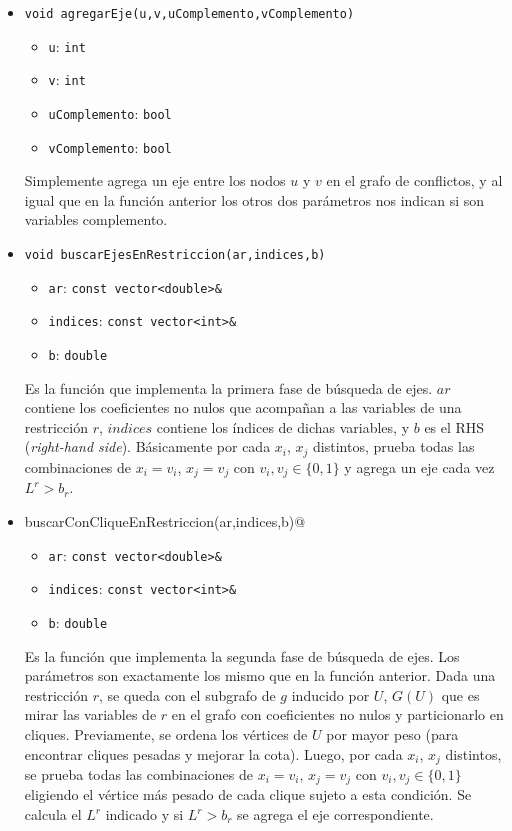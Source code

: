 \begin{itemize}
\item \verb_void agregarEje(u,v,uComplemento,vComplemento)_
	\begin{itemize}
	\item \verb_u_: \verb_int_
	\item \verb_v_: \verb_int_
	\item \verb_uComplemento_: \verb_bool_
	\item \verb_vComplemento_: \verb_bool_
	\end{itemize}
Simplemente agrega un eje entre los nodos $u$ y $v$ en el grafo de conflictos, y al igual que en la funci\'on anterior los otros dos par\'ametros nos indican si son variables complemento.

\item \verb_void buscarEjesEnRestriccion(ar,indices,b)_
	\begin{itemize}
	\item \verb_ar_: \verb_const vector<double>&_
	\item \verb_indices_: \verb_const vector<int>&_
	\item \verb_b_: \verb_double_
	\end{itemize}
Es la funci\'on que implementa la primera fase de b\'usqueda de ejes. $ar$ contiene los coeficientes no nulos que acompañan a las variables de una restricci\'on $r$, $indices$ contiene los \'indices de dichas variables, y $b$ es el RHS (\emph{right-hand side}). B\'asicamente por cada $x_i$, $x_j$ distintos, prueba todas las combinaciones de $x_i = v_i$, $x_j = v_j$ con $v_i,v_j\in \{0,1\}$ y agrega un eje cada vez $L^r > b_r$.

\item \verb@void buscarConCliqueEnRestriccion(ar,indices,b)@ 
	\begin{itemize}
	\item \verb_ar_: \verb_const vector<double>&_
	\item \verb_indices_: \verb_const vector<int>&_
	\item \verb_b_: \verb_double_
	\end{itemize}
Es la funci\'on que implementa la segunda fase de b\'usqueda de ejes. Los par\'ametros son exactamente los mismo que en la funci\'on anterior. Dada una restricci\'on $r$, se queda con el subgrafo de $g$ inducido por $U$, $G(U)$ que es mirar las variables de $r$ en el grafo con coeficientes no nulos y particionarlo en cliques. Previamente, se ordena los v\'ertices de $U$ por mayor peso (para encontrar cliques pesadas y mejorar la cota). Luego, por cada $x_i$, $x_j$ distintos, se prueba todas las combinaciones de $x_i = v_i$, $x_j = v_j$ con $v_i,v_j\in \{0,1\}$ eligiendo el v\'ertice m\'as pesado de cada clique sujeto a esta condici\'on. Se calcula el $L^r$ indicado y si $L^r > b_r$ se agrega el eje correspondiente.


\end{itemize}
